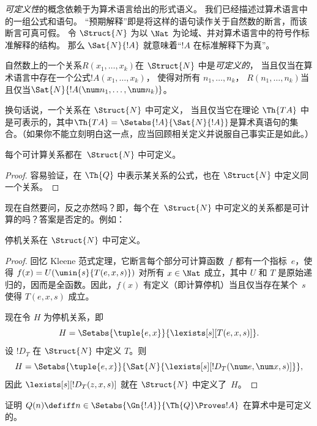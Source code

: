 \documentclass[../../../include/open-logic-section]{subfiles}
\begin{document}


\emph{可定义性}的概念依赖于为算术语言给出的形式语义。
我们已经描述过算术语言中的一组公式和语句。
“预期解释”即是将这样的语句读作关于自然数的断言，而该断言可真可假。
令 $\Struct{N}$ 为以 $\Nat$ 为论域、并对算术语言中的符号作标准解释的结构。
那么 $\Sat{N}{!A}$ 就意味着“$!A$ 在标准解释下为真”。

\begin{defn}
自然数上的一个关系$R(x_1,\dots,x_k)$在 $\Struct{N}$ 中是\emph{可定义的}，
当且仅当在算术语言中存在一个公式$!A(x_1,\dots,x_k)$，
使得对所有 $n_1,\dots,n_k$，
$R(n_1,\dots,n_k)$当且仅当$\Sat{N}{!A(\num n_1,\dots,\num
  n_k)}$。
\end{defn}

换句话说，一个关系在 $\Struct{N}$ 中可定义，
当且仅当它在理论 $\Th{TA}$ 中是可表示的，其中$\Th{TA} =
\Setabs{!A}{\Sat{N}{!A}}$是算术真语句的集合。（如果你不能立刻明白这一点，应当回顾相关定义并说服自己事实正是如此。）

\begin{lem}
每个可计算关系都在~$\Struct{N}$ 中可定义。
\end{lem}

\begin{proof}
容易验证，在 $\Th{Q}$ 中表示某关系的公式，也在 $\Struct{N}$ 中定义同一个关系。
\end{proof}

现在自然要问，反之亦然吗？即，每个在~$\Struct{N}$ 中可定义的关系都是可计算的吗？答案是否定的。例如：

\begin{lem}
停机关系在 $\Struct{N}$ 中可定义。
\end{lem}

\begin{proof}
回忆 Kleene 范式定理，它断言每个部分可计算函数~$f$ 都有一个指标~$e$，使得 $f(x) =
U(\umin{s}{T(e,x,s)})$ 对所有 $x \in \Nat$ 成立，其中 $U$ 和 $T$ 是原始递归的，因而是全函数。因此，$f(x)$ 有定义（即计算停机）当且仅当存在某个~$s$ 使得 $T(e,x,s)$ 成立。

现在令 $H$ 为停机关系，即
\[
H = \Setabs{\tuple{e,x}}{\lexists[s][T(e, x, s)]}.
\]
设 $!D_T$ 在 $\Struct{N}$ 中定义 $T$。则
\[
H = \Setabs{\tuple{e,x}}{\Sat{N}{\lexists[s][!D_T(\num e, \num x, s)]}},
\]
因此 $\lexists[s][!D_T(z, x, s)]$ 就在 $\Struct{N}$ 中定义了~$H$。
\end{proof}

\begin{prob}
证明 $Q(n) \defiff n \in \Setabs{\Gn{!A}}{\Th{Q} \Proves !A}$ 在算术中是可定义的。
\end{prob}
\end{document}

